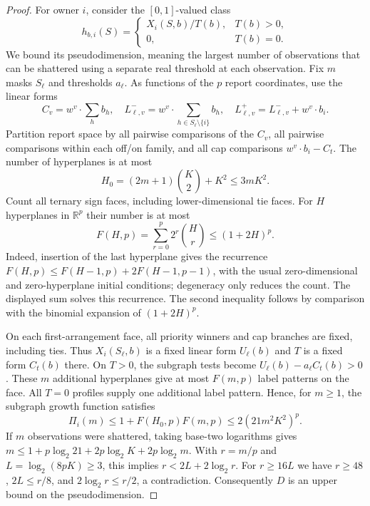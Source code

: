 \documentclass[11pt]{article}
\theoremstyle{definition}\newtheorem{definition}[theorem]{Definition}
\theoremstyle{remark}\newtheorem{remark}[theorem]{Remark}
\newcommand{\R}{\mathbb R}
\begin{document}
\begin{proof}
For owner $i$, consider the $[0,1]$-valued class
\[
 h_{b,i}(S)=\begin{cases}X_i(S,b)/T(b),&T(b)>0,\\0,&T(b)=0.
 \end{cases}
\]
We bound its pseudodimension, meaning the largest number of observations
that can be shattered using a separate real threshold at each observation.
Fix $m$ masks $S_\ell$ and thresholds $a_\ell$.
As functions of the $p$ report coordinates, use the linear forms
\[
 C_v=w^v\cdot\sum_h b_h,\quad
 L^-_{\ell,v}=w^v\cdot\sum_{h\in S_\ell\setminus\{i\}}b_h,
 \quad L^+_{\ell,v}=L^-_{\ell,v}+w^v\cdot b_i.
\]
Partition report space by all pairwise comparisons of the $C_v$, all pairwise
comparisons within each off/on family, and all cap comparisons
$w^v\cdot b_i-C_t$.  The number of hyperplanes is at most
\[
 H_0=(2m+1)\binom K2+K^2\le3mK^2.
\]
Count all ternary sign faces, including lower-dimensional tie faces.
For $H$ hyperplanes in $\R^p$ their number is at most
\begin{equation}\label{alg:faces}
 F(H,p)=\sum_{r=0}^p2^r\binom Hr\le(1+2H)^p.
\end{equation}
Indeed, insertion of the last hyperplane gives the recurrence
$F(H,p)\le F(H-1,p)+2F(H-1,p-1)$, with the usual zero-dimensional
and zero-hyperplane initial conditions; degeneracy only reduces the count.
The displayed sum solves this recurrence.  The second inequality follows
by comparison with the binomial expansion of $(1+2H)^p$.

On each first-arrangement face, all priority winners and cap branches are
fixed, including ties.  Thus $X_i(S_\ell,b)$ is a fixed linear form
$U_\ell(b)$ and $T$ is a fixed form $C_t(b)$ there.
On $T>0$, the subgraph tests become
$U_\ell(b)-a_\ell C_t(b)>0$.  These $m$ additional hyperplanes give at
most $F(m,p)$ label patterns on the face.  All $T=0$ profiles supply one
additional label pattern.  Hence, for $m\ge1$, the subgraph growth function
satisfies
\[
 \Pi_i(m)\le1+F(H_0,p)F(m,p)\le2(21m^2K^2)^p.
\]
If $m$ observations were shattered, taking base-two logarithms gives
$m\le1+p\log_2 21+2p\log_2K+2p\log_2m$.
With $r=m/p$ and $L=\log_2(8pK)\ge3$, this implies
$r<2L+2\log_2r$.  For $r\ge16L$ we have $r\ge48$,
$2L\le r/8$, and $2\log_2r\le r/2$, a contradiction.
Consequently $D$ is an upper bound on the pseudodimension.


\end{proof}
\end{document}
